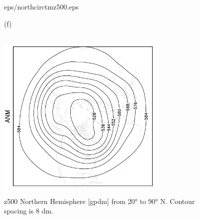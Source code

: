 \documentclass[12pt,a4paper,twoside,openright,headinclude,liststotoc,bibtotoc]{scrreprt}
\begin{document}
\begin{appendix}
\begin{figure}[b]
{{eps/northcirctmz500.eps}
}
\parbox{8.5cm}{\hspace{0.80cm} \begin{scriptsize}(f) \end{scriptsize} \vspace{-0.5cm} \\
\includegraphics[height=7.5cm,angle=-90]
{eps/northcirct21tmz500.eps}
}
\caption[z500 Northern Hemisphere]{z500 Northern Hemisphere [gpdm] from 20° to 90° N. Contour spacing is 8 dm.}
\label{img:z500north}
\end{figure}




\end{appendix}
\end{document}
